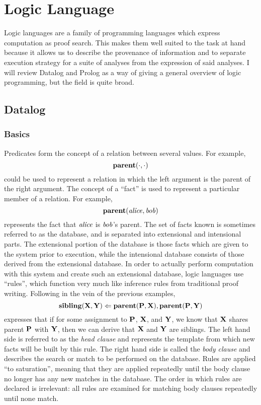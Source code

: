 \label{chap:background}
\section{Logic Language}
Logic languages are a family of programming languages which express computation as proof search.
This makes them well suited to the task at hand because it allows us to describe the provenance of information and to separate execution strategy for a suite of analyses from the expression of said analyses.
I will review Datalog and Prolog as a way of giving a general overview of logic programming, but the field is quite broad.
\subsection{Datalog}
\subsubsection{Basics}
Predicates form the concept of a relation between several values.
For example,
\[
        {\bf parent}(\cdot, \cdot)
\]
could be used to represent a relation in which the left argument is the parent of the right argument.
The concept of a ``fact'' is used to represent a particular member of a relation. For example,
\[
        {\bf parent}({\it alice}, {\it bob})
\]
represents the fact that ${\it alice}$ is ${\it bob}$'s parent.
The set of facts known is sometimes referred to as the database, and is separated into extensional and intensional parts.
The extensional portion of the database is those facts which are given to the system prior to execution, while the intensional database consists of those derived from the extensional database.
In order to actually perform computation with this system and create such an extensional database, logic languages use ``rules'', which function very much like inference rules from traditional proof writing.
Following in the vein of the previous examples,
\[
        {\bf sibling}({\bf X}, {\bf Y}) \Leftarrow {\bf parent}({\bf P}, {\bf X}), {\bf parent}({\bf P}, {\bf Y})
\]
expresses that if for some assignment to ${\bf P}$, ${\bf X}$, and ${\bf Y}$, we know that ${\bf X}$ shares parent ${\bf P}$ with ${\bf Y}$, then we can derive that ${\bf X}$ and ${\bf Y}$ are siblings.
The left hand side is referred to as the \emph{head clause} and represents the template from which new facts will be built by this rule.
The right hand side is called the \emph{body clause} and describes the search or match to be performed on the database.
Rules are applied ``to saturation'', meaning that they are applied repeatedly until the body clause no longer has any new matches in the database.
The order in which rules are declared is irrelevant: all rules are examined for matching body clauses repeatedly until none match.
